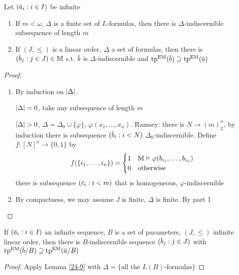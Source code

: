 \documentclass[11pt]{article}
\begin{document}
\begin{lemma}[]
\label{24-9}
Let \((\bara_i:i\in I)\) be infinite
\begin{enumerate}
\item If \(m<\omega\), \(\Delta\) is a finite set of \(L\)-formulas, then there is \(\Delta\)-indiscernible subsequence of
length \(m\)
\item If \((J,\le)\) is a linear order, \(\Delta\) a set of formulas, then there is \((\barb_j:j\in J)\in\M\)
s.t. \(\barb\) is \(\Delta\)-indiscernible and \(\tp^{\EM}(\barb)\supseteq\tp^{\EM}(\bara)\)
\end{enumerate}
\end{lemma}

\begin{proof}
\begin{enumerate}
\item By induction on \(\abs{\Delta}\).

\(\abs{\Delta}=0\), take any subsequence of length \(m\)

\(\abs{\Delta}>0\), \(\Delta=\Delta_0\cup\{\varphi\}\), \(\varphi(x_1,\dots,x_n)\). Ramsey: there is \(N\to(m)^n_2\), by induction
there is subsequence \((\barb_i:i<N)\) \(\Delta_0\)-indiscernible. Define \(f:[N]^n\to\{0,1\}\) by
\begin{equation*}
f(\{i_1,\dots,i_n\})=
\begin{cases}
1&\mathbb{M}\vDash\varphi(b_{i_1},\dots,b_{i_n})\\
0&\text{otherwise}
\end{cases}
\end{equation*}
there is subsequence \((\barc_i:i<m)\) that is homogeneous, \(\varphi\)-indiscernible

\item By compactness, we may assume \(J\) is finite, \(\Delta\) is finite. By part 1
\end{enumerate}
\end{proof}

\begin{theorem}[]
If \((\bara_i:i\in I)\) an infinite sequence, \(B\) is a set of parameters, \((J,\le)\) infinite
linear order, then there is \(B\)-indiscernible sequence \((\barb_j:j\in J)\) with
\(\tp^{\EM}(\barb/B)\supseteq\tp^{\EM}(\bara/B)\)
\end{theorem}

\begin{proof}
Apply Lemma \ref{24-9} with \(\Delta=\{\text{all the }L(B)\text{-formulas}\}\)
\end{proof}
\end{document}
